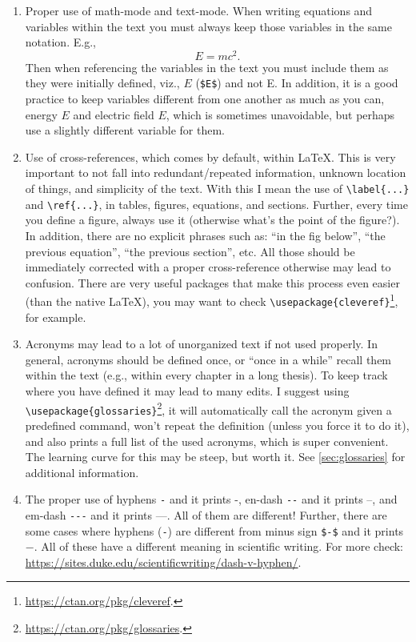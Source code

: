 \begin{enumerate}

  \item Proper use of math-mode and text-mode. When writing equations and variables within the text you must always keep those variables in the same notation. E.g.,
  \begin{equation}
      E = mc^2.
  \end{equation}
  Then when referencing the variables in the text you must include them as they were initially defined, viz., $E$ (\verb|$E$|) and not E. In addition, it is a good practice to keep variables different from one another as much as you can, energy $E$ and electric field $E$, which is sometimes unavoidable, but perhaps use a slightly different variable for them. 

  \item {Use of cross-references}, which comes by default, within \LaTeX. This is very important to not fall into redundant/repeated information, unknown location of things, and simplicity of the text. With this I mean the use of \verb|\label{...}| and \verb|\ref{...}|, in tables, figures, equations, and sections. Further, every time you define a figure, always use it (otherwise what's the point of the figure?). In addition, there are no explicit phrases such as: ``in the fig below'', ``the previous equation'', ``the previous section'', etc. All those should be immediately corrected with a proper cross-reference otherwise may lead to confusion. There are very useful packages that make this process even easier (than the native \LaTeX), you may want to check \verb|\usepackage{cleveref}|\footnote{\url{https://ctan.org/pkg/cleveref}.}, for example.
  
  \item Acronyms may lead to a lot of unorganized text if not used properly. In general, acronyms should be defined once, or ``once in a while'' recall them within the text (e.g., within every chapter in a long thesis). To keep track where you have defined it may lead to many edits. I suggest using \verb|\usepackage{glossaries}|\footnote{\url{https://ctan.org/pkg/glossaries}.}, it will automatically call the acronym given a predefined command, won't repeat the definition (unless you force it to do it), and also prints a full list of the used acronyms, which is super convenient. The learning curve for this may be steep, but worth it. See \cref{sec:glossaries} for additional information.
  
  \item The proper use of hyphens \verb|-| and it prints -, en-dash \verb|--| and it prints --, and em-dash \verb|---| and it prints ---. All of them are different! Further, there are some cases where hyphens (\verb|-|) are different from minus sign \verb|$-$| and it prints $-$. All of these have a different meaning in scientific writing. For more check: \url{https://sites.duke.edu/scientificwriting/dash-v-hyphen/}.
  

\end{enumerate}
